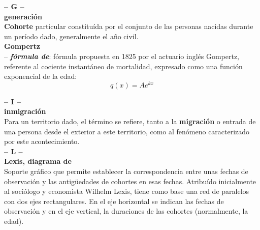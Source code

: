 \begin{multicols}{2}
\noindent\textbf{\huge{-- G --}}\\

\noindent \textbf{\Large{generaci\'on}}\\

\vspace{-0.3cm}
\textbf{Cohorte} particular constitu\'ida por el conjunto de las personas nacidas durante un per\'iodo dado, generalmente el a\~no civil.\\

\noindent \textbf{\Large{Gompertz}}\\

\vspace{-0.3cm}
--  \textbf{\textit{fórmula de}}: fórmula propuesta en 1825 por el actuario inglés Gompertz, referente al cociente instantáneo de mortalidad, expresado como una función exponencial de la edad:$$q(x)=Ae^{kx}$$


\noindent\textbf{\huge{-- I --}}\\

\noindent \textbf{\Large{inmigraci\'on}}\\

\vspace{-0.3cm}
Para un territorio dado, el t\'ermino se refiere, tanto a la \textbf{migraci\'on} o entrada de una persona desde el exterior a este territorio, como al fen\'omeno caracterizado por este acontecimiento.\\



\noindent\textbf{\huge{-- L --}}\\

\noindent \textbf{\Large{Lexis, diagrama de}}\\

\vspace{-0.3cm}
Soporte gr\'afico que permite establecer la correspondencia entre unas fechas de observaci\'on y las antig\"uedades de cohortes en esas fechas. Atribu\'ido inicialmente al soci\'ologo y economista Wilhelm Lexis, tiene como base una red de paralelos con dos ejes rectangulares. En el eje horizontal se indican las fechas de observaci\'on y en el eje vertical, la duraciones de las cohortes (normalmente, la edad).


\end{multicols}
